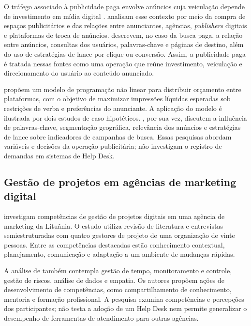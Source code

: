 O tráfego associado à publicidade paga envolve anúncios cuja veiculação depende de investimento em mídia digital \cite{agus2019,nain2025}.  analisam esse contexto por meio da compra de espaços publicitários e das relações entre anunciantes, agências, \textit{publishers} digitais e plataformas de troca de anúncios.  descrevem, no caso da busca paga, a relação entre anúncios, consultas dos usuários, palavras-chave e páginas de destino, além do uso de estratégias de lance por clique ou conversão. Assim, a publicidade paga é tratada nessas fontes como uma operação que reúne investimento, veiculação e direcionamento do usuário ao conteúdo anunciado.

 propõem um modelo de programação não linear para distribuir orçamento entre plataformas, com o objetivo de maximizar impressões líquidas esperadas sob restrições de verba e preferências do anunciante. A aplicação do modelo é ilustrada por dois estudos de caso hipotéticos. , por sua vez, discutem a influência de palavras-chave, segmentação geográfica, relevância dos anúncios e estratégias de lance sobre indicadores de campanhas de busca. Essas pesquisas abordam variáveis e decisões da operação publicitária; não investigam o registro de demandas em sistemas de Help Desk.

\subsection{\esp Gestão de projetos em agências de marketing digital}

 investigam competências de gestão de projetos digitais em uma agência de marketing da Lituânia. O estudo utiliza revisão de literatura e entrevistas semiestruturadas com quatro gestores de projeto de uma organização de vinte pessoas. Entre as competências destacadas estão conhecimento contextual, planejamento, comunicação e adaptação a um ambiente de mudanças rápidas.

A análise de  também contempla gestão de tempo, monitoramento e controle, gestão de riscos, análise de dados e empatia. Os autores propõem ações de desenvolvimento de competências, como compartilhamento de conhecimento, mentoria e formação profissional. A pesquisa examina competências e percepções dos participantes; não testa a adoção de um Help Desk nem permite generalizar o desempenho de ferramentas de atendimento para outras agências.

